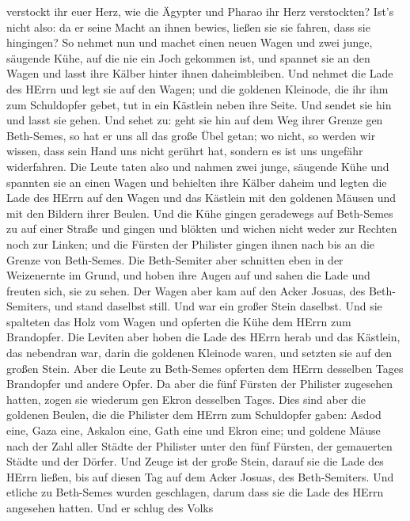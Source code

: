 verstockt ihr euer Herz, wie die Ägypter und Pharao ihr Herz
verstockten? Ist's nicht also: da er seine Macht an ihnen bewies, ließen
sie sie fahren, dass sie hingingen?  So nehmet nun und
machet einen neuen Wagen und zwei junge, säugende Kühe, auf die nie ein
Joch gekommen ist, und spannet sie an den Wagen und lasst ihre Kälber
hinter ihnen daheimbleiben.  Und nehmet die Lade des HErrn
und legt sie auf den Wagen; und die goldenen Kleinode, die ihr ihm zum
Schuldopfer gebet, tut in ein Kästlein neben ihre Seite. Und sendet sie
hin und lasst sie gehen.  Und sehet zu: geht sie hin auf dem
Weg ihrer Grenze gen Beth-Semes, so hat er uns all das große Übel getan;
wo nicht, so werden wir wissen, dass sein Hand uns nicht gerührt hat,
sondern es ist uns ungefähr widerfahren.  Die Leute taten
also und nahmen zwei junge, säugende Kühe und spannten sie an einen
Wagen und behielten ihre Kälber daheim  und legten die Lade
des HErrn auf den Wagen und das Kästlein mit den goldenen Mäusen und mit
den Bildern ihrer Beulen.  Und die Kühe gingen geradewegs
auf Beth-Semes zu auf einer Straße und gingen und blökten und wichen
nicht weder zur Rechten noch zur Linken; und die Fürsten der Philister
gingen ihnen nach bis an die Grenze von Beth-Semes.  Die
Beth-Semiter aber schnitten eben in der Weizenernte im Grund, und hoben
ihre Augen auf und sahen die Lade und freuten sich, sie zu sehen.
 Der Wagen aber kam auf den Acker Josuas, des
Beth-Semiters, und stand daselbst still. Und war ein großer Stein
daselbst. Und sie spalteten das Holz vom Wagen und opferten die Kühe dem
HErrn zum Brandopfer.  Die Leviten aber hoben die Lade des
HErrn herab und das Kästlein, das nebendran war, darin die goldenen
Kleinode waren, und setzten sie auf den großen Stein. Aber die Leute zu
Beth-Semes opferten dem HErrn desselben Tages Brandopfer und andere
Opfer.  Da aber die fünf Fürsten der Philister zugesehen
hatten, zogen sie wiederum gen Ekron desselben Tages.  Dies
sind aber die goldenen Beulen, die die Philister dem HErrn zum
Schuldopfer gaben: Asdod eine, Gaza eine, Askalon eine, Gath eine und
Ekron eine;  und goldene Mäuse nach der Zahl aller Städte
der Philister unter den fünf Fürsten, der gemauerten Städte und der
Dörfer. Und Zeuge ist der große Stein, darauf sie die Lade des HErrn
ließen, bis auf diesen Tag auf dem Acker Josuas, des Beth-Semiters.
 Und etliche zu Beth-Semes wurden geschlagen, darum dass
sie die Lade des HErrn angesehen hatten. Und er schlug des Volks
